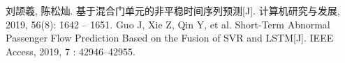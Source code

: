 \newpage
\appendix
\begin{thebibliography}{99}
\songti{}
刘颉羲, 陈松灿. 基于混合门单元的非平稳时间序列预测[J]. 计算机研究与发展, 2019, 56(8): 1642 – 1651.
Guo J, Xie Z, Qin Y, et al. Short-Term Abnormal Passenger Flow Prediction Based on the Fusion of SVR and LSTM[J]. IEEE Access, 2019, 7 : 42946–42955. 

\end{thebibliography}